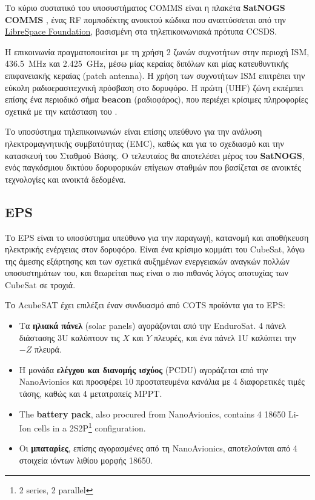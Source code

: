 \documentclass[a4paper,nobib]{tufte-book}
\begin{document}
Το κύριο συστατικό του υποσυστήματος \acs{COMMS} είναι η πλακέτα \textbf{SatNOGS COMMS} \autocite{surligas_satnogscomms_2021}, ένας \acs{RF} πομποδέκτης ανοικτού κώδικα που αναπτύσσεται από την \href{https://libre.space/}{LibreSpace Foundation}, βασισμένη στα τηλεπικοινωνιακά πρότυπα \acs{CCSDS}.

Η επικοινωνία πραγματοποιείται με τη χρήση 2 ζωνών συχνοτήτων στην περιοχή \acs{ISM}, \SI{436.5}{\mega\hertz} και \SI{2.425}{\giga\hertz}, μέσω μίας κεραίας διπόλων και μίας κατευθυντικής επιφανειακής κεραίας (patch antenna). Η χρήση των συχνοτήτων \acs{ISM} επιτρέπει την εύκολη ραδιοερασιτεχνική πρόσβαση στο δορυφόρο. Η πρώτη (\acs{UHF}) ζώνη εκπέμπει επίσης ένα περιοδικό σήμα \textbf{beacon} (ραδιοφάρος), που περιέχει κρίσιμες πληροφορίες σχετικά με την κατάσταση του .

Το υποσύστημα τηλεπικοινωνιών είναι επίσης υπεύθυνο για την ανάλυση ηλεκτρομαγνητικής συμβατότητας (\acs{EMC}), καθώς και για το σχεδιασμό και την κατασκευή του Σταθμού Βάσης. Ο τελευταίος θα αποτελέσει μέρος του \textbf{SatNOGS}\autocite{white_overview_satellite_2018}, ενός παγκόσμιου δικτύου δορυφορικών επίγειων σταθμών που βασίζεται σε ανοικτές τεχνολογίες και ανοικτά δεδομένα.

\subsection{\acf{EPS}}

Το \ac{EPS} είναι το υποσύστημα υπεύθυνο για την παραγωγή, κατανομή και αποθήκευση ηλεκτρικής ενέργειας στον δορυφόρο. Είναι ένα κρίσιμο κομμάτι του CubeSat, λόγω της άμεσης εξάρτησης και των σχετικά αυξημένων ενεργειακών αναγκών πολλών υποσυστημάτων του, και θεωρείται πως είναι ο πιο πιθανός λόγος αποτυχίας των CubeSat σε τροχιά. \autocite{langer_reliability_cubesats_2016}

Το AcubeSAT έχει επιλέξει έναν συνδυασμό από \ac{COTS} προϊόντα για το \ac{EPS}:\autocite{DDJF_SYS}
\begin{itemize}
	\item Τα \textbf{ηλιακά πάνελ} (solar panels) αγοράζονται από την EnduroSat. 4 πάνελ διάστασης 3U καλύπτουν τις \(X\) και \(Y\) πλευρές, και ένα πάνελ 1U καλύπτει την \(-Z\) πλευρά.
	\item Η μονάδα \textbf{ελέγχου και διανομής ισχύος} (\ac{PCDU}) αγοράζεται από την NanoAvionics και προσφέρει 10 προστατευμένα κανάλια με 4 διαφορετικές τιμές τάσης, καθώς και 4 μετατροπείς \ac{MPPT}.
	\item The \textbf{battery pack}, also procured from NanoAvionics, contains 4 18650 Li-Ion cells in a 2S2P\footnote{2 series, 2 parallel} configuration.
	\item Οι \textbf{μπαταρίες}, επίσης αγορασμένες από τη NanoAvionics, αποτελούνται από 4 στοιχεία ιόντων λιθίου μορφής 18650.
\end{itemize}
\end{document}
